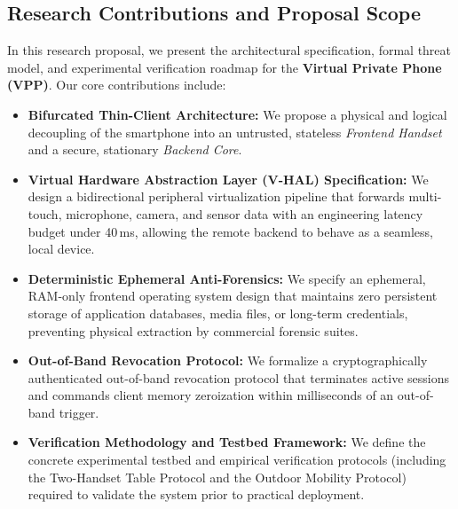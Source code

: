 \subsection{Research Contributions and Proposal Scope}
In this research proposal, we present the architectural specification, formal threat model, and experimental verification roadmap for the \textbf{Virtual Private Phone (VPP)}. Our core contributions include:
\begin{itemize}
    \item \textbf{Bifurcated Thin-Client Architecture:} We propose a physical and logical decoupling of the smartphone into an untrusted, stateless \textit{Frontend Handset} and a secure, stationary \textit{Backend Core}.
    \item \textbf{Virtual Hardware Abstraction Layer (V-HAL) Specification:} We design a bidirectional peripheral virtualization pipeline that forwards multi-touch, microphone, camera, and sensor data with an engineering latency budget under 40\,ms, allowing the remote backend to behave as a seamless, local device.
    \item \textbf{Deterministic Ephemeral Anti-Forensics:} We specify an ephemeral, RAM-only frontend operating system design that maintains zero persistent storage of application databases, media files, or long-term credentials, preventing physical extraction by commercial forensic suites.
    \item \textbf{Out-of-Band Revocation Protocol:} We formalize a cryptographically authenticated out-of-band revocation protocol that terminates active sessions and commands client memory zeroization within milliseconds of an out-of-band trigger.
    \item \textbf{Verification Methodology and Testbed Framework:} We define the concrete experimental testbed and empirical verification protocols (including the Two-Handset Table Protocol and the Outdoor Mobility Protocol) required to validate the system prior to practical deployment.
\end{itemize}
